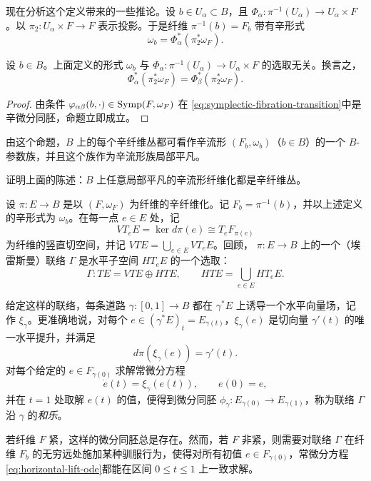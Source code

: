 现在分析这个定义带来的一些推论。设 $b\in U_\alpha\subset B$，且
$\Phi_\alpha:\pi^{-1}(U_\alpha)\to U_\alpha\times F$。以
$\pi_2:U_\alpha\times F\to F$ 表示投影。于是纤维
$\pi^{-1}(b)=F_b$ 带有辛形式
\[
 \omega_b=\Phi_\alpha^*(\pi_2^*\omega_F).
\]

\begin{proposition}\label{prop:fiberwise-symplectic-form-independent}
设 $b\in B$。上面定义的形式 $\omega_b$ 与
$\Phi_\alpha:\pi^{-1}(U_\alpha)\to U_\alpha\times F$ 的选取无关。换言之，
\[
 \Phi_\alpha^*(\pi_2^*\omega_F)
 =\Phi_\beta^*(\pi_2^*\omega_F).
\]
\end{proposition}

\begin{proof}
由条件 $\varphi_{\alpha\beta}(b,\cdot)\in\operatorname{Symp}(F,\omega_F)$ 在
\eqref{eq:symplectic-fibration-transition}中是辛微分同胚，命题立即成立。
\end{proof}

由这个命题，$B$ 上的每个辛纤维丛都可看作辛流形
$(F_b,\omega_b)$（$b\in B$）的一个 $B$-参数族，并且这个族作为辛流形族局部平凡。

\begin{exercise}\label{ex:locally-trivial-symplectic-family}
证明上面的陈述：$B$ 上任意局部平凡的辛流形纤维化都是辛纤维丛。
\end{exercise}

设 $\pi:E\to B$ 是以 $(F,\omega_F)$ 为纤维的辛纤维化。记
$F_b=\pi^{-1}(b)$，并以上述定义的辛形式为 $\omega_b$。在每一点
$e\in E$ 处，记
\[
 VT_eE=\ker d\pi(e)\cong T_eF_{\pi(e)}
\]
为纤维的竖直切空间，并记 $VTE=\bigcup_{e\in E}VT_eE$。回顾，
$\pi:E\to B$ 上的一个（埃雷斯曼）联络 $\Gamma$ 是水平子空间
$HT_eE$ 的一个选取：
\[
 \Gamma:TE=VTE\oplus HTE,
 \qquad HTE=\bigcup_{e\in E}HT_eE.
\]

给定这样的联络，每条道路 $\gamma:[0,1]\to B$ 都在 $\gamma^*E$ 上诱导一个水平向量场，记作 $\xi_\gamma$。更准确地说，对每个
$e\in(\gamma^*E)_t=E_{\gamma(t)}$，$\xi_\gamma(e)$ 是切向量
$\gamma'(t)$ 的唯一水平提升，并满足
\[
 d\pi(\xi_\gamma(e))=\gamma'(t).
\]
对每个给定的 $e\in F_{\gamma(0)}$ 求解常微分方程
\begin{equation}
 \dot e(t)=\xi_\gamma(e(t)),\qquad e(0)=e,
 \label{eq:horizontal-lift-ode}
\end{equation}
并在 $t=1$ 处取解 $e(t)$ 的值，便得到微分同胚
$\phi_\gamma:E_{\gamma(0)}\to E_{\gamma(1)}$，称为联络 $\Gamma$ 沿
$\gamma$ 的\emph{和乐}。

\begin{remark}\label{rem:holonomy-noncompact-fiber}
若纤维 $F$ 紧，这样的微分同胚总是存在。然而，若 $F$ 非紧，则需要对联络 $\Gamma$ 在纤维 $F_b$ 的无穷远处施加某种驯服行为，使得对所有初值
$e\in F_{\gamma(0)}$，常微分方程\eqref{eq:horizontal-lift-ode}都能在区间
$0\leq t\leq1$ 上一致求解。
\end{remark}

